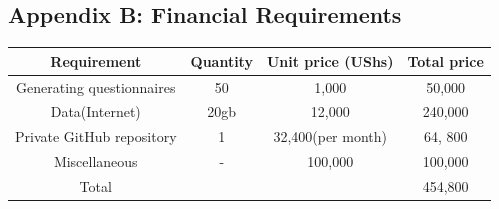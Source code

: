 \documentclass[12pt]{article}
\begin{document}
	\subsection{Appendix B: Financial Requirements}
	\begin{tabular} {|c|c|c|c|}
	\hline
	Requirement & Quantity & Unit price (UShs) & Total price \\ \hline
	Generating questionnaires & 50 &  1,000 & 50,000 \\ \hline
	Data(Internet) & 20gb &  12,000 & 240,000 \\ \hline
	Private GitHub repository & 1 &  32,400(per month) & 64, 800\\ \hline
	Miscellaneous & -  & 100,000 & 100,000\\ \hline
	Total &  &  & 454,800\\ \hline
\end{tabular}
\end{document}
